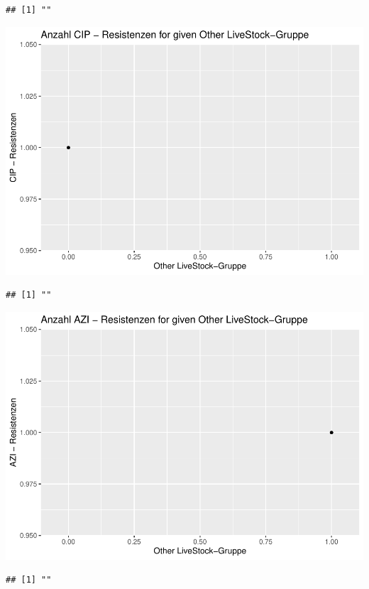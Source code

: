 \documentclass[
]{article}
\begin{document}
\begin{verbatim}
## [1] ""
\end{verbatim}

\includegraphics{NResistenzen_files/figure-latex/binary_or_nominal_variables-12.pdf}

\begin{verbatim}
## [1] ""
\end{verbatim}

\includegraphics{NResistenzen_files/figure-latex/binary_or_nominal_variables-13.pdf}

\begin{verbatim}
## [1] ""
\end{verbatim}
\end{document}

